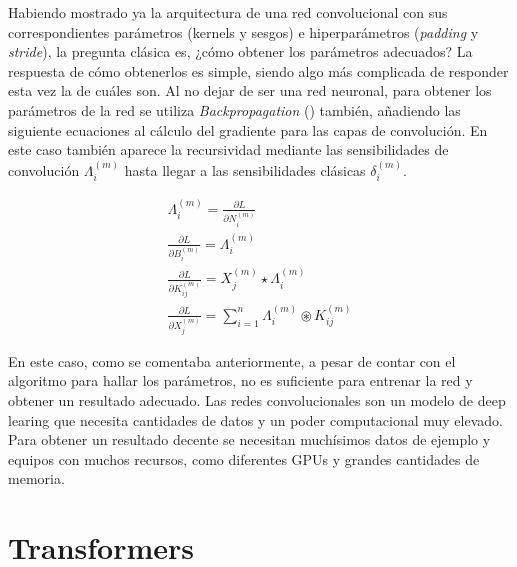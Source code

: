 			Habiendo mostrado ya la arquitectura de una red convolucional con sus correspondientes parámetros (kernels y sesgos) e hiperparámetros (\textit{padding} y \textit{stride}), la pregunta clásica es, ¿cómo obtener los parámetros adecuados? La respuesta de cómo obtenerlos es simple, siendo algo más complicada de responder esta vez la de cuáles son. Al no dejar de ser una red neuronal, para obtener los parámetros de la red se utiliza \textit{Backpropagation} () también, añadiendo las siguiente ecuaciones \cite{backpropCNN} al cálculo del gradiente para las capas de convolución. En este caso también aparece la recursividad mediante las sensibilidades de convolución $\Lambda_i^{(m)}$ hasta llegar a las sensibilidades clásicas $\delta_i^{(m)}$. 
			
			$$
			\begin{gathered}
				\Lambda_i^{(m)} = \frac{\partial L}{\partial N_i^{(m)}}\\
				\frac{\partial L}{\partial B_{i}^{(m)}} = \Lambda_i^{(m)}\\
				\frac{\partial L}{\partial K_{ij}^{(m)}} = X_j^{(m)}\star\Lambda_i^{(m)}\\
				\frac{\partial L}{\partial X_j^{(m)}} = \sum_{i = 1}^n\Lambda_i^{(m)}\circledast K_{ij}^{(m)}
			\end{gathered}
			$$
 		
			En este caso, como se comentaba anteriormente, a pesar de contar con el algoritmo para hallar los parámetros, no es suficiente para entrenar la red y obtener un resultado adecuado. Las redes convolucionales son un modelo de deep learing que necesita cantidades de datos y un poder computacional muy elevado. Para obtener un resultado decente se necesitan muchísimos datos de ejemplo y equipos con muchos recursos, como diferentes GPUs y grandes cantidades de memoria. 
			
		\section{Transformers}
			

